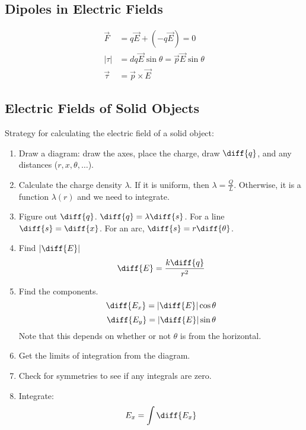 \documentclass{math}
\begin{document}
\subsection*{Dipoles in Electric Fields}
\begin{center}
\end{center}
\begin{align*}
  \vec{F} &= q\vec{E}+(-q\vec{E}) = 0 \\
  |\tau| &= dq\vec{E}\sin\theta = \vec{p}\vec{E}\sin\theta \\
  \vec{\tau} &= \vec{p}\times\vec{E}
\end{align*}

\subsection*{Electric Fields of Solid Objects}
Strategy for calculating the electric field of a solid object:
\begin{enumerate}
  \item Draw a diagram: draw the axes, place the charge, draw \( \diff{q} \),
  and any distances (\( r,x,\theta,\dots \)).
  \item Calculate the charge density \( \lambda \). If it is uniform, then
  \( \lambda = \frac{Q}{L} \). Otherwise, it is a function \( \lambda(r) \) and
  we need to integrate.
  \item Figure out \( \diff{q} \). \( \diff{q} = \lambda\diff{s} \). For a line
  \( \diff{s} = \diff{x} \). For an arc, \( \diff{s} = r\diff{\theta} \).
  \item Find \( |\diff{E}| \)
  \[ \diff{E} = \frac{k\diff{q}}{r^2} \]
  \item Find the components.
  \[ \diff{E_x} = |\diff{E}|\cos\theta \]
  \[ \diff{E_y} = |\diff{E}|\sin\theta \]
  Note that this depends on whether or not \( \theta \) is from the horizontal.
  \item Get the limits of integration from the diagram.
  \item Check for symmetries to see if any integrals are zero.
  \item Integrate:
  \[ E_x = \int\diff{E_x} \]
\end{enumerate}
\end{document}
